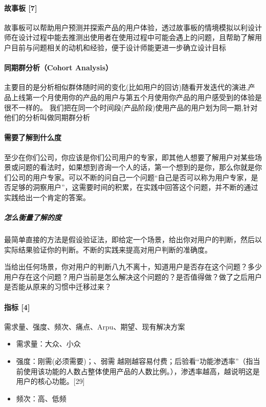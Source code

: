 \documentclass[letterpaper,10pt,english]{sphinxmanual}
\begin{document}
\paragraph{故事板 {[}7{]}}
\label{\detokenize{chapter_knowledge/users_analysis:id20}}
故事板可以帮助用户预测并探索产品的用户体验，透过故事板的情境模拟以利设计师在设计过程中能去推测出使用者在使用过程中可能会遇上的问题，且帮助了解用户目前与问题相关的动机和经验，便于设计师能更进一步确立设计目标


\paragraph{同期群分析（Cohort Analysis）}
\label{\detokenize{chapter_knowledge/users_analysis:cohort-analysis}}
主要目的是分析相似群体随时间的变化(比如用户的回访)随看开发迭代的演进,产品上线第一个月使用你的产品的用户与第五个月使用你产品的用户感受到的体验是很不一样的。
我们把在同一个时间段(产品阶段)使用产品的用户划为同一期,针对他们的分析叫做同期群分析


\paragraph{需要了解到什么度}
\label{\detokenize{chapter_knowledge/users_analysis:id21}}
至少在你们公司，你应该是你们公司用户的专家，即其他人想要了解用户对某些场景或问题的看法时，如果想到咨询一个人的话，第一个想到的是你，那么你就是你们公司的用户专家。可以不断的问自己一个问题“自己是否可以称为用户专家，是否足够的洞察用户”，这需要时间的积累，在实践中回答这个问题，并不断的通过实践给出一个肯定的答案。


\subparagraph{怎么衡量了解的度}
\label{\detokenize{chapter_knowledge/users_analysis:id22}}
最简单直接的方法是假设验证法，即给定一个场景，给出你对用户的判断，然后以实际结果验证你的判断。不断的实践来提高对用户判断的准确度。

当给出任何场景，你对用户的判断八九不离十，知道用户是否存在这个问题？多少用户存在这个问题？用户当前是怎么解决这个问题的？是否值得做？做了之后用户是否能从原来的习惯中迁移过来？


\paragraph{指标 {[}4{]}}
\label{\detokenize{chapter_knowledge/users_analysis:id23}}
需求量、强度、频次、痛点、Arpu、期望、现有解决方案
\begin{itemize}
\item {} 
需求量：大众、小众

\item {} 
强度：刚需(必须需要)；、弱需
越刚越容易付费；后验看“功能渗透率”（指当前使用该功能的人数占整体使用产品的人数比例。），渗透率越高，越说明这是用户的核心功能。{[}29{]}

\item {} 
频次：高、低频

\end{itemize}
\end{document}
